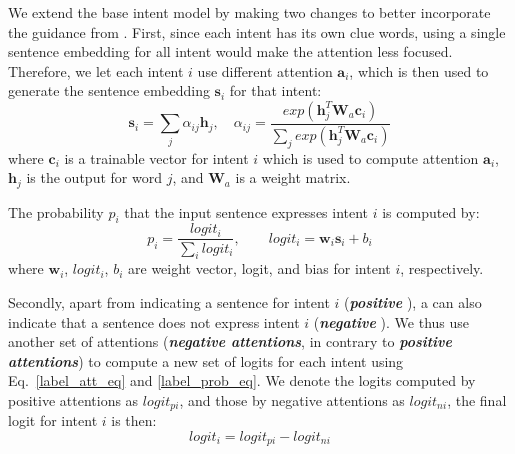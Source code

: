 We extend the base intent model by making two changes to better incorporate the guidance from \RE.
First, since each intent has its own clue words, using a single sentence embedding for all intent %
would make the attention less focused.
Therefore, we let each intent $i$ use different attention $\textbf{a}_i$, which is then used to generate the sentence embedding $\textbf{s}_i$ for that intent:
\begin{equation}
\textbf{s}_i = \sum_{j}{\alpha_{ij}\textbf{h}_j}, \quad
\alpha_{ij}=\frac{exp(\textbf{h}_j^T\textbf{W}_a\textbf{c}_i)}{\sum_{j}{exp(\textbf{h}_j^T\textbf{W}_a\textbf{c}_i)}}
\label{label_att_eq}
\end{equation}
where $\textbf{c}_i$ is a trainable vector for intent $i$ which is used to compute attention $\textbf{a}_i$, $\textbf{h}_j$ is the \BLSTM output for word $j$, and $\textbf{W}_a$ is a weight matrix.

The probability $p_i$ that the input sentence expresses intent $i$ is computed by:
\begin{equation}
p_i = \frac{logit_i}{\sum_{i}{logit_i}}, \quad\quad logit_i=\textbf{w}_i\textbf{s}_i + b_i
\label{label_prob_eq}
\end{equation}
where $\textbf{w}_i$, $logit_i$, $b_i$ are weight vector, logit, and bias for intent $i$, respectively.

Secondly, apart from indicating a sentence for intent $i$ (\textbf{\emph{positive \REs}}), 
a \RE can also indicate that a sentence does not express intent $i$ (\textbf{\emph{negative \REs}}). 
We thus use another set of attentions (\textbf{\emph{negative attentions}}, in contrary to \textbf{\emph{positive attentions}}) 
to compute a new set of logits for each intent using Eq.~\ref{label_att_eq} and \ref{label_prob_eq}.
We denote the logits computed by positive attentions as $logit_{pi}$, and those by negative attentions as $logit_{ni}$, the final logit for intent $i$ is then:
\begin{equation}
logit_i = logit_{pi} - logit_{ni}
\end{equation}

